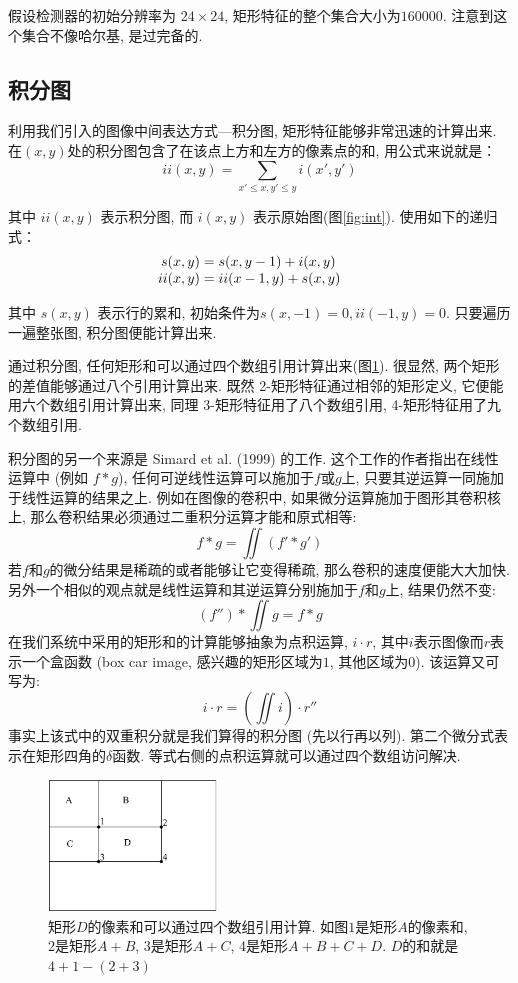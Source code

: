 \documentclass[a4paper,utf8,11pt, onecolumn]{ctexart}
\begin{document}
假设检测器的初始分辨率为 $24\times24$, 矩形特征的整个集合大小为$160000$. 注意到这个集合不像哈尔基, 是过完备的.

\subsection{积分图}
利用我们引入的图像中间表达方式---积分图, 矩形特征能够非常迅速的计算出来. 在$(x, y)$处的积分图包含了在该点上方和左方的像素点的和, 用公式来说就是：
\[
    ii(x, y)= \sum_{x'\leq x, y'\leq y} i(x', y')
\]

其中 $ii(x, y)$ 表示积分图, 而 $i(x, y)$ 表示原始图(图\ref{fig:int}). 使用如下的递归式：
\[
    \begin{array}{r@{}>{{}}l@{\qquad}r@{}>{{}}l}
        s(x,y)&=s(x,y-1)+i(x,y)\\
        ii(x,y)&=ii(x-1,y)+s(x,y)
    \end{array}
\]

其中 $s(x, y)$ 表示行的累和, 初始条件为$s(x,-1)=0, ii(-1,y)=0$. 只要遍历一遍整张图, 积分图便能计算出来. 

通过积分图, 任何矩形和可以通过四个数组引用计算出来(图\ref{fig:feature_calculate}). 很显然, 两个矩形的差值能够通过八个引用计算出来. 既然 2-矩形特征通过相邻的矩形定义, 它便能用六个数组引用计算出来, 同理 3-矩形特征用了八个数组引用, 4-矩形特征用了九个数组引用.

积分图的另一个来源是 Simard et al. (1999) 的工作. 这个工作的作者指出在线性运算中 (例如 $f\ast g$), 任何可逆线性运算可以施加于$f$或$g$上, 只要其逆运算一同施加于线性运算的结果之上. 例如在图像的卷积中, 如果微分运算施加于图形其卷积核上, 那么卷积结果必须通过二重积分运算才能和原式相等:
\[
    f\ast g = \iint(f'\ast g')
\]
若$f$和$g$的微分结果是稀疏的或者能够让它变得稀疏, 那么卷积的速度便能大大加快. 另外一个相似的观点就是线性运算和其逆运算分别施加于$f$和$g$上, 结果仍然不变:
\[
    (f'')\ast\iint g = f\ast g
\]
在我们系统中采用的矩形和的计算能够抽象为点积运算, $i\cdot r$, 其中$i$表示图像而$r$表示一个盒函数 (box car image, 感兴趣的矩形区域为$1$, 其他区域为$0$). 该运算又可写为:
\[
    i\cdot r = (\iint i)\cdot r''
\]
事实上该式中的双重积分就是我们算得的积分图 (先以行再以列). 第二个微分式表示在矩形四角的$\delta$函数. 等式右侧的点积运算就可以通过四个数组访问解决.
\begin{figure}[!t]
\centering
\includegraphics[width=0.4\textwidth]{feature_calculate.png}
\caption{矩形$D$的像素和可以通过四个数组引用计算. 如图$1$是矩形$A$的像素和, $2$是矩形$A+B$, $3$是矩形$A+C$, $4$是矩形$A+B+C+D$. $D$的和就是$4+1-(2+3)$}
\label{fig:feature_calculate}
\end{figure}
\end{document}
